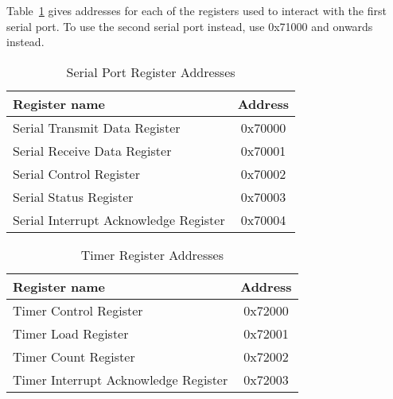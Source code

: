 Table~\ref{table:serial_offsets_absolute} gives addresses for each of the
registers used to interact with the first serial port. To use the second
serial port instead, use 0x71000 and onwards instead.

\begin{table}[h]
    \begin{center}
    \begin{tabular}{|l|c|}
    \hline
    \textbf{Register name} & \textbf{Address} \\
    \hline
    Serial Transmit Data Register & 0x70000 \\
    \hline
    Serial Receive Data Register & 0x70001 \\
    \hline
    Serial Control Register & 0x70002 \\
    \hline
    Serial Status Register & 0x70003 \\
    \hline
    Serial Interrupt Acknowledge Register & 0x70004 \\
    \hline
    \end{tabular}
    \caption{Serial Port Register Addresses}
    \label{table:serial_offsets_absolute}
    \end{center}
\end{table}

\begin{table}[h]
    \begin{center}
    \begin{tabular}{|l|c|}
    \hline
    \textbf{Register name} & \textbf{Address} \\
    \hline
    Timer Control Register & 0x72000 \\
    \hline
    Timer Load Register & 0x72001 \\
    \hline
    Timer Count Register & 0x72002 \\
    \hline
    Timer Interrupt Acknowledge Register & 0x72003 \\
    \hline
    \end{tabular}
    \caption{Timer Register Addresses}
    \label{table:timer_offsets_absolute}
    \end{center}
    \end{table}

